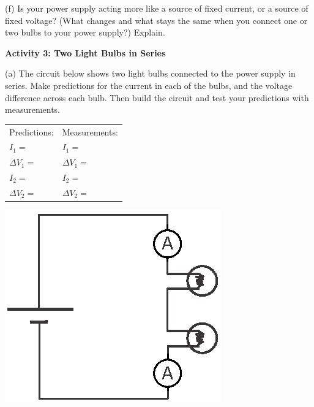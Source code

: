 (f) Is your power supply acting more like a source of fixed current, or a source of fixed voltage?  (What changes and what stays the same when you connect one or two bulbs to your power supply?) Explain.
\answerspace{0.6 in}


\pagebreak[2]
\textbf{Activity 3: Two Light Bulbs in Series} \par

(a) The circuit below shows two light bulbs connected to the power supply in series.  Make predictions for the current in each of the bulbs, and the voltage difference across each bulb.  Then build the circuit and test your predictions with measurements.  \par


\begin{minipage}{0.7\textwidth}
\vspace{0.1 in}
{\renewcommand{\arraystretch}{1.6}
\hspace*{0.5in}
\begin{tabular}{l l}
Predictions: \hspace{0.5in} & Measurements: \\
$I_1 =$ & $I_1 =$ \\
$\Delta V_1 =$ & $\Delta V_1 =$ \\
$I_2 =$ & $I_2 =$ \\
$\Delta V_2 =$ & $\Delta V_2 =$ \\
\end{tabular}}
\vspace{0.3in}
\end{minipage}
\begin{minipage}{0.3\textwidth}
\includegraphics[width=\textwidth]{electric_circuits/circ_diag4.eps}
\end{minipage}

